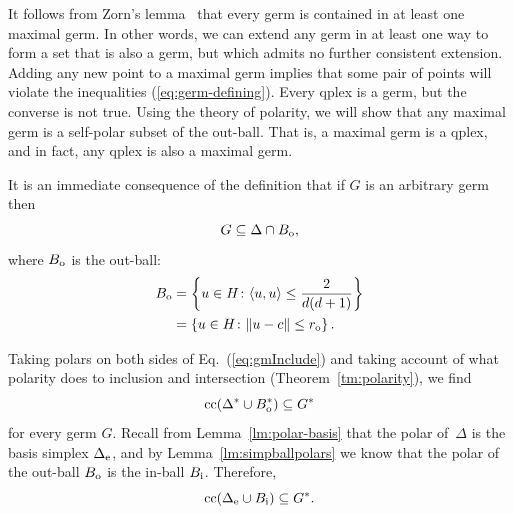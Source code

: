 \documentclass[aps,pra,superscriptaddress,10pt,tightenlines,twocolumn,nofootinbib]{revtex4}
\theoremstyle{remark}
\newcommand{\be}{\begin{equation}}
\newcommand{\ee}{\end{equation}}
\newcommand{\ea}[1]{\begin{align}#1\end{align}}
\newcommand{\bs}{\Delta_{\rm{e}}}
\newcommand{\ps}{\Delta}
\newcommand{\dl}[1]{#1^{*}}
\newcommand{\bo}{B_{\rm{o}}}
\newcommand{\bi}{B_{\rm{i}}}
\newcommand{\ro}{r_{\rm{o}}}
\newcommand{\pr}{G}
\newcommand{\inprod}[2]{{\left\langle #1 , #2 \right\rangle}}
\DeclareMathOperator{\cc}{cc}
\begin{document}
It follows from Zorn's lemma~\cite{Zorn} that every germ is contained
in at least one maximal germ.  In other words, we can extend any germ
in at least one way to form a set that is also a germ, but which
admits no further consistent extension.  Adding any new point to a
maximal germ implies that some pair of points will violate the
inequalities (\ref{eq:germ-defining}).  Every qplex is a germ, but the
converse is not true.  Using the theory of polarity, we will show that
any maximal germ is a self-polar subset of the out-ball.  That is, a
maximal germ is a qplex, and in fact, any qplex is also a maximal
germ.



It is an immediate consequence of the definition that if $\pr$ is an arbitrary germ then
\be
\pr \subseteq \ps \cap \bo,
\label{eq:gmInclude}
\ee
where $\bo$ is the out-ball:
\ea{
\bo &= \left\{u \in H \colon \inprod{u}{u} \le \frac{2}{d(d+1)}
\right\} \\
 & = \left\{ u\in H \colon \| u- c\| \le  \ro \right\}.
}

Taking polars on both sides of Eq.~(\ref{eq:gmInclude}) and taking account of what polarity does to inclusion and intersection (Theorem~\ref{tm:polarity}), we find
\be
\cc (\dl{\ps} \cup \dl{\bo}) \subseteq \dl{\pr}
\label{eq:gmIncludeStar}
\ee
for every germ $\pr$.  Recall from Lemma~\ref{lm:polar-basis} that the polar of~$\Delta$ is the basis simplex $\bs$, and by Lemma~\ref{lm:simpballpolars} we know that the polar of the out-ball $\bo$ is the in-ball $\bi$.  Therefore,
\be
\cc (\bs \cup \bi) \subseteq \dl{\pr}.
\ee
\end{document}
